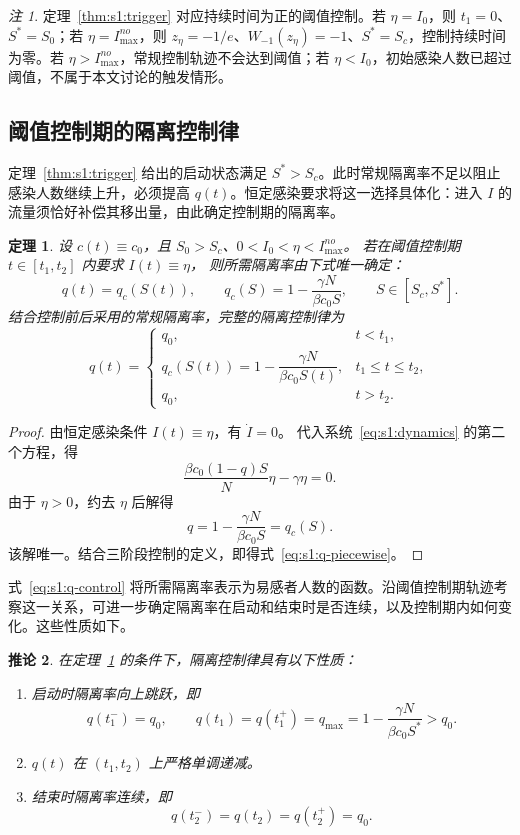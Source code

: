 \documentclass[UTF8,a4paper,10pt,fontset=fandol]{ctexart}
\theoremstyle{cnplain}
\newtheorem{theorem}{定理}[section]
\newtheorem{corollaryn}[theorem]{推论}
\theoremstyle{remark}
\newtheorem*{remark}{注}
\numberwithin{equation}{section}
\begin{document}
\begin{remark}
定理~\ref{thm:s1:trigger} 对应持续时间为正的阈值控制。若 $\eta=I_0$，则 $t_1=0$、$S^*=S_0$；若 $\eta=I_{\max}^{no}$，则 $z_\eta=-1/e$、$W_{-1}(z_\eta)=-1$、$S^*=S_c$，控制持续时间为零。若 $\eta>I_{\max}^{no}$，常规控制轨迹不会达到阈值；若 $\eta<I_0$，初始感染人数已超过阈值，不属于本文讨论的触发情形。
\end{remark}

\subsection{阈值控制期的隔离控制律}
定理~\ref{thm:s1:trigger} 给出的启动状态满足 $S^*>S_c$。此时常规隔离率不足以阻止感染人数继续上升，必须提高 $q(t)$。恒定感染要求将这一选择具体化：进入 $I$ 的流量须恰好补偿其移出量，由此确定控制期的隔离率。

\begin{theorem}
\label{thm:s1:qc-structure}
设 $c(t)\equiv c_0$，且 $S_0>S_c$、$0<I_0<\eta<I_{\max}^{no}$。
若在阈值控制期 $t\in[t_1,t_2]$ 内要求 $I(t)\equiv\eta$，
则所需隔离率由下式唯一确定：
\begin{equation}
q(t)=q_c(S(t)),\qquad
q_c(S)=1-\frac{\gamma N}{\beta c_0S},\qquad S\in[S_c,S^*].
\label{eq:s1:q-control}
\end{equation}
结合控制前后采用的常规隔离率，完整的隔离控制律为
\begin{equation}
q(t)=
\begin{cases}
q_0, & t<t_1,\\[0.35em]
q_c(S(t))=1-\dfrac{\gamma N}{\beta c_0S(t)}, & t_1\le t\le t_2,\\[0.7em]
q_0, & t>t_2.
\end{cases}
\label{eq:s1:q-piecewise}
\end{equation}
\end{theorem}

\begin{proof}
由恒定感染条件 $I(t)\equiv\eta$，有 $\dot I=0$。
代入系统~\eqref{eq:s1:dynamics} 的第二个方程，得
\[
\frac{\beta c_0(1-q)S}{N}\eta-\gamma\eta=0.
\]
由于 $\eta>0$，约去 $\eta$ 后解得
\[
q=1-\frac{\gamma N}{\beta c_0S}=q_c(S).
\]
该解唯一。结合三阶段控制的定义，即得式~\eqref{eq:s1:q-piecewise}。
\end{proof}

式~\eqref{eq:s1:q-control} 将所需隔离率表示为易感者人数的函数。沿阈值控制期轨迹考察这一关系，可进一步确定隔离率在启动和结束时是否连续，以及控制期内如何变化。这些性质如下。

\begin{corollaryn}
\label{cor:s1:qc-structure}
在定理~\ref{thm:s1:qc-structure} 的条件下，隔离控制律具有以下性质：
\begin{enumerate}
\renewcommand{\labelenumi}{(\roman{enumi})}
    \item 启动时隔离率向上跳跃，即
    \[
    q(t_1^-)=q_0,\qquad
    q(t_1)=q(t_1^+)=q_{\max}
    =1-\frac{\gamma N}{\beta c_0S^*}>q_0.
    \]
    \item $q(t)$ 在 $(t_1,t_2)$ 上严格单调递减。
    \item 结束时隔离率连续，即
    \[
    q(t_2^-)=q(t_2)=q(t_2^+)=q_0.
    \]
\end{enumerate}
\end{corollaryn}
\end{document}
